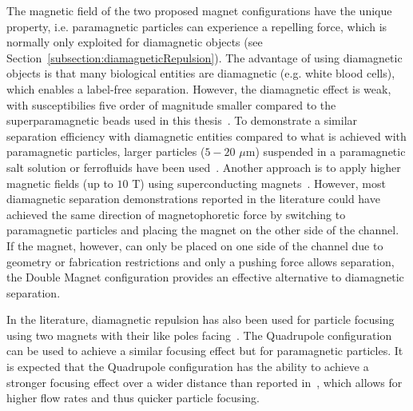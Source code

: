 The magnetic field of the two proposed magnet configurations have the unique property, i.e. paramagnetic particles can experience a repelling force, which is normally only exploited for diamagnetic objects (see Section~\ref{subsection:diamagneticRepulsion}). The advantage of using diamagnetic objects is that many biological entities are diamagnetic (e.g. white blood cells), which enables a label-free separation. However, the diamagnetic effect is weak, with susceptibilies five order of magnitude smaller compared to the superparamagnetic beads used in this thesis~\cite{Tarn2009,Tarn2013,Shen2012,Takayasu2000}. To demonstrate a similar separation efficiency with diamagnetic entities compared to what is achieved with paramagnetic particles, larger particles ($5-20$ $\mu$m) suspended in a paramagnetic salt solution or ferrofluids have been used~\cite{Zeng2013,Zhou2016,Zhou2016a,Zhou2017}. Another approach is to apply higher magnetic fields (up to $10$ T) using superconducting magnets~\cite{Tarn2009,Vojtisek2012}. However, most diamagnetic separation demonstrations reported in the literature could have achieved the same direction of magnetophoretic force by switching to paramagnetic particles and placing the magnet on the other side of the channel. If the magnet, however, can only be placed on one side of the channel due to geometry or fabrication restrictions and only a pushing force allows separation, the Double Magnet configuration provides an effective alternative to diamagnetic separation. 

In the literature, diamagnetic repulsion has also been used for particle focusing using two magnets with their like poles facing~\cite{Zhu2010,Zhu2011,Liang2011,Rodriguez-Villarreal2011}. The Quadrupole configuration can be used to achieve a similar focusing effect but for paramagnetic particles. It is expected that the Quadrupole configuration has the ability to achieve a stronger focusing effect over a wider distance than reported in~\cite{Rodriguez-Villarreal2011}, which allows for higher flow rates and thus quicker particle focusing.


